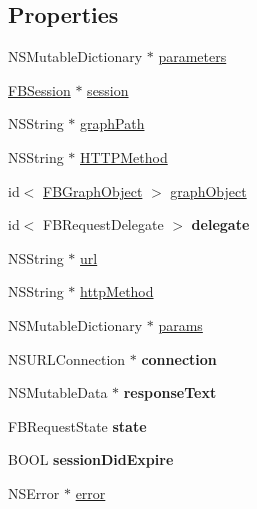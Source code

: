 \subsection*{Properties}
\begin{DoxyCompactItemize}
\item 
N\+S\+Mutable\+Dictionary $\ast$ \hyperlink{interfaceFBRequest_a232db9ea9dc47acebd52ee9f8b2d3a9c}{parameters}
\item 
\hyperlink{interfaceFBSession}{F\+B\+Session} $\ast$ \hyperlink{interfaceFBRequest_a06b3fcf0ba6f0a5719833165b9816ec7}{session}
\item 
N\+S\+String $\ast$ \hyperlink{interfaceFBRequest_a0bd3f881663e33c43fbf4206f1c970ab}{graph\+Path}
\item 
N\+S\+String $\ast$ \hyperlink{interfaceFBRequest_a234d79d710bbfa72a1bc3c4b0793def1}{H\+T\+T\+P\+Method}
\item 
id$<$ \hyperlink{interfaceFBGraphObject}{F\+B\+Graph\+Object} $>$ \hyperlink{interfaceFBRequest_ae7e1b415ae4b2da5173c8ba545577feb}{graph\+Object}
\item 
\mbox{\label{interfaceFBRequest_ada8e5967d9f8f17fca3fe89eb00e98bb}} 
id$<$ F\+B\+Request\+Delegate $>$ {\bfseries delegate}
\item 
N\+S\+String $\ast$ \hyperlink{interfaceFBRequest_ac05e6fc5503b9806a900c423ce1f65d5}{url}
\item 
N\+S\+String $\ast$ \hyperlink{interfaceFBRequest_af74fe5bc235b8895dbe0f051239649d6}{http\+Method}
\item 
N\+S\+Mutable\+Dictionary $\ast$ \hyperlink{interfaceFBRequest_abc65f409227938e45243e9aa31c3f1d5}{params}
\item 
\mbox{\label{interfaceFBRequest_a00bafc9661bbaea656bfc38f77220eab}} 
N\+S\+U\+R\+L\+Connection $\ast$ {\bfseries connection}
\item 
\mbox{\label{interfaceFBRequest_ab7b9305a106ab823c4f4a262fadeff9b}} 
N\+S\+Mutable\+Data $\ast$ {\bfseries response\+Text}
\item 
\mbox{\label{interfaceFBRequest_aa0f292c25cc25f3cca94f3b4b5d9ac79}} 
F\+B\+Request\+State {\bfseries state}
\item 
\mbox{\label{interfaceFBRequest_a86c9b764a9eb7e908119839cb2e7afcb}} 
B\+O\+OL {\bfseries session\+Did\+Expire}
\item 
N\+S\+Error $\ast$ \hyperlink{interfaceFBRequest_aa77c503e3a8a4141487e3593fc285927}{error}
\end{DoxyCompactItemize}


